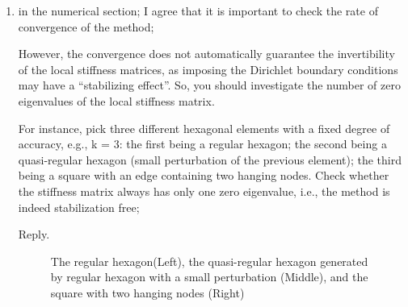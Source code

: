\documentclass[10pt]{amsart}
\theoremstyle{definition}
\theoremstyle{remark}
\begin{document}
\begin{enumerate}[1.]

\item \textsf{
in the numerical section; I agree that it is important to check the rate of
convergence of the method;}

\textsf{However, the convergence does not automatically
guarantee the invertibility of the local stiffness matrices, as imposing the
Dirichlet boundary conditions may have a “stabilizing effect”. So, you should
investigate the number of zero eigenvalues of the local stiffness matrix.}

\textsf{For instance, pick three different hexagonal elements with a fixed degree of
accuracy, e.g., k = 3: the first being a regular hexagon; the second being a
quasi-regular hexagon (small perturbation of the previous element); the third
being a square with an edge containing two hanging nodes. Check whether the
stiffness matrix always has only one zero eigenvalue, i.e., the method is indeed
stabilization free; 
}

\smallskip \noindent \textcolor[rgb]{1.00,0.00,0.00}{Reply.}
\begin{figure}[h]
\centering
{}
\caption{The regular hexagon(Left), the quasi-regular hexagon generated by regular
    hexagon with a small perturbation (Middle), 
and the square with two hanging nodes (Right)}
  \label{fig:hexagon} %
\end{figure}


\end{enumerate}
\end{document}

